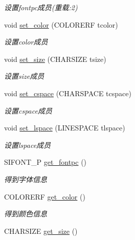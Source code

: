 \begin{DoxyCompactItemize}
\begin{DoxyCompactList}\small\item\em 设置fontpc成员(重载\+:2) \end{DoxyCompactList}\item 
void \hyperlink{class_s_i_c_h_a_r___i_n_f_o_a3c7718568eb9ff885af1bdfa8c197236}{set\+\_\+color} (C\+O\+L\+O\+R\+E\+RF tcolor)
\begin{DoxyCompactList}\small\item\em 设置color成员 \end{DoxyCompactList}\item 
void \hyperlink{class_s_i_c_h_a_r___i_n_f_o_afe883164593a8d3a5c9377eb5454c9f1}{set\+\_\+size} (C\+H\+A\+R\+S\+I\+ZE tsize)
\begin{DoxyCompactList}\small\item\em 设置size成员 \end{DoxyCompactList}\item 
void \hyperlink{class_s_i_c_h_a_r___i_n_f_o_a18aaf35f07094cb42942663a71456227}{set\+\_\+cspace} (C\+H\+A\+R\+S\+P\+A\+CE tcspace)
\begin{DoxyCompactList}\small\item\em 设置cspace成员 \end{DoxyCompactList}\item 
void \hyperlink{class_s_i_c_h_a_r___i_n_f_o_af38e1eac74e8d9c14e5c5d05d58f8b36}{set\+\_\+lspace} (L\+I\+N\+E\+S\+P\+A\+CE tlspace)
\begin{DoxyCompactList}\small\item\em 设置lspace成员 \end{DoxyCompactList}\item 
S\+I\+F\+O\+N\+T\+\_\+P \hyperlink{class_s_i_c_h_a_r___i_n_f_o_ad53aa1c6641e81bf0b79f17836aa5dfa}{get\+\_\+fontpc} ()
\begin{DoxyCompactList}\small\item\em 得到字体信息~\newline
\end{DoxyCompactList}\item 
C\+O\+L\+O\+R\+E\+RF \hyperlink{class_s_i_c_h_a_r___i_n_f_o_acd6d47c6cf5f266e18033e45763d6272}{get\+\_\+color} ()
\begin{DoxyCompactList}\small\item\em 得到颜色信息~\newline
\end{DoxyCompactList}\item 
C\+H\+A\+R\+S\+I\+ZE \hyperlink{class_s_i_c_h_a_r___i_n_f_o_aae2cfbd0b6bbb122008da027f662291b}{get\+\_\+size} ()

\end{DoxyCompactItemize}
